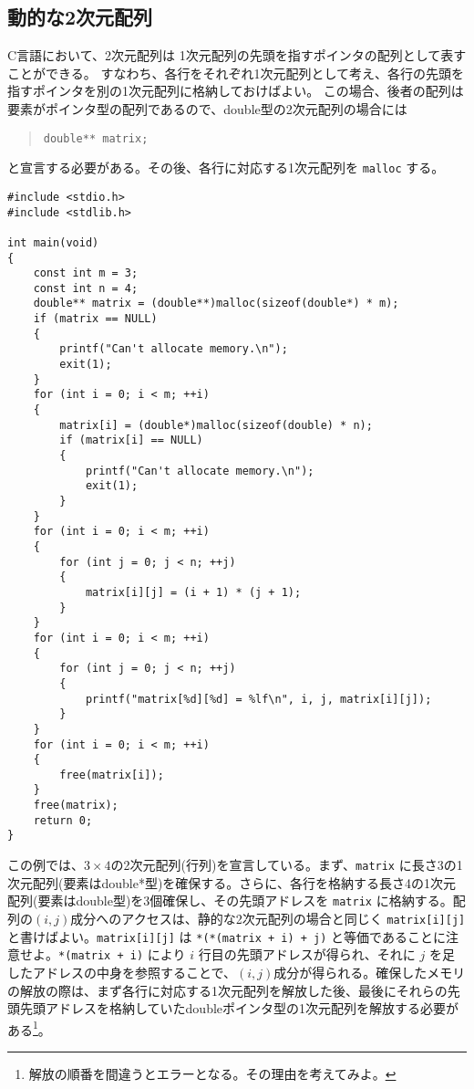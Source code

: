 \subsection{動的な2次元配列}

C言語において、2次元配列は 1次元配列の先頭を指すポインタの配列として表すことができる。
すなわち、各行をそれぞれ1次元配列として考え、各行の先頭を指すポインタを別の1次元配列に格納しておけばよい。
この場合、後者の配列は要素がポインタ型の配列であるので、double型の2次元配列の場合には
\begin{quote}
    \begin{verbatim}
double** matrix;
\end{verbatim}
\end{quote}
と宣言する必要がある。その後、各行に対応する1次元配列を \texttt{malloc} する。
\begin{reidai}\label{ex:malloc-2dim}
    \begin{verbatim}
#include <stdio.h>
#include <stdlib.h>

int main(void)
{
    const int m = 3;
    const int n = 4;
    double** matrix = (double**)malloc(sizeof(double*) * m);
    if (matrix == NULL)
    {
        printf("Can't allocate memory.\n");
        exit(1);
    }
    for (int i = 0; i < m; ++i)
    {
        matrix[i] = (double*)malloc(sizeof(double) * n);
        if (matrix[i] == NULL)
        {
            printf("Can't allocate memory.\n");
            exit(1);
        }
    }
    for (int i = 0; i < m; ++i)
    {
        for (int j = 0; j < n; ++j)
        {
            matrix[i][j] = (i + 1) * (j + 1);
        }
    }
    for (int i = 0; i < m; ++i)
    {
        for (int j = 0; j < n; ++j)
        {
            printf("matrix[%d][%d] = %lf\n", i, j, matrix[i][j]);
        }
    }
    for (int i = 0; i < m; ++i)
    {
        free(matrix[i]);
    }
    free(matrix);
    return 0;
}
\end{verbatim}
\end{reidai} \noindent
この例では、\(3 \times 4\)の2次元配列(行列)を宣言している。まず、\texttt{matrix} に長さ3の1次元配列(要素はdouble*型)を確保する。さらに、各行を格納する長さ4の1次元配列(要素はdouble型)を3個確保し、その先頭アドレスを \texttt{matrix} に格納する。配列の\((i,j)\)成分へのアクセスは、静的な2次元配列の場合と同じく \texttt{matrix[i][j]} と書けばよい。\texttt{matrix[i][j]} は \texttt{*(*(matrix + i) + j)} と等価であることに注意せよ。\texttt{*(matrix + i)} により \(i\) 行目の先頭アドレスが得られ、それに \(j\) を足したアドレスの中身を参照することで、\((i,j)\)成分が得られる。確保したメモリの解放の際は、まず各行に対応する1次元配列を解放した後、最後にそれらの先頭先頭アドレスを格納していたdoubleポインタ型の1次元配列を解放する必要がある\footnote{解放の順番を間違うとエラーとなる。その理由を考えてみよ。}。

